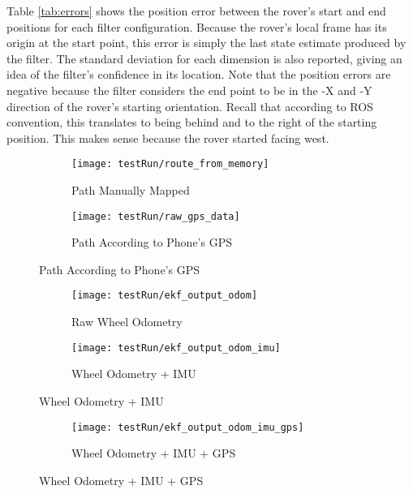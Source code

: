 Table \ref{tab:errors} shows the position error between the rover's start and end positions for each filter configuration. Because the rover's local frame has its origin at the start point, this error is simply the last state estimate produced by the filter. The standard deviation for each dimension is also reported, giving an idea of the filter's confidence in its location. Note that the position errors are negative because the filter considers the end point to be in the -X and -Y direction of the rover's starting orientation. Recall that according to ROS convention, this translates to being behind and to the right of the starting position. This makes sense because the rover started facing west.

\begin{figure}[p] 
	\caption{
		The rover's path.
	}
	\label{fig:roverPath}
	\begin{subfigure}{\textwidth}
		\centering
		\texttt{[image: testRun/route\_from\_memory]}
		\caption{Path Manually Mapped}
		\label{figRouteMemory}
	\end{subfigure}
	\begin{subfigure}{\textwidth}
		\centering
		\texttt{[image: testRun/raw\_gps\_data]}
		\caption{Path According to Phone's GPS}
		\label{figRouteGPS}
	\end{subfigure}
	
\end{figure}

\begin{figure}[p] 
	\caption{
		Filter Outputs For Different Sensor Fusions
	}
	\label{fig:ekfOutputs}
	\begin{subfigure}{\textwidth}
		\centering
		\texttt{[image: testRun/ekf\_output\_odom]}
		\caption{Raw Wheel Odometry}
		\label{figRouteOdom}
	\end{subfigure}
	\begin{subfigure}{\textwidth}
		\centering
		\texttt{[image: testRun/ekf\_output\_odom\_imu]}
		\caption{Wheel Odometry + IMU}
		\label{figRouteOdomImu}
	\end{subfigure}
	
\end{figure}

\begin{figure}[p] \ContinuedFloat
	\begin{subfigure}{\textwidth}
		\centering
		\texttt{[image: testRun/ekf\_output\_odom\_imu\_gps]}
		\caption{Wheel Odometry + IMU + GPS}
		\label{figRouteOdomImuGps}
	\end{subfigure}
\end{figure}